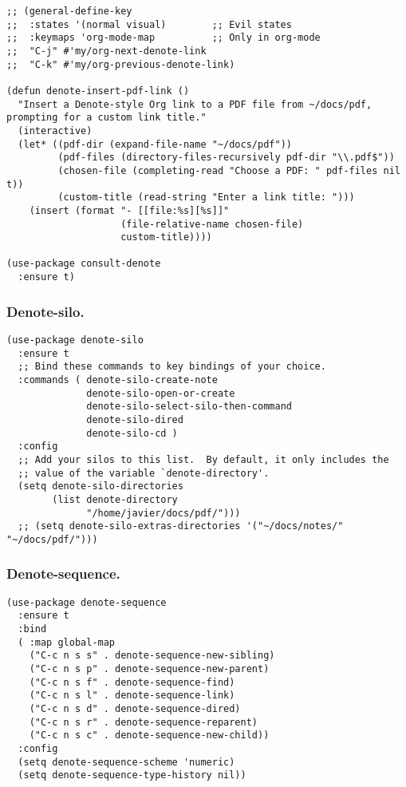 \documentclass[11pt]{article}
\begin{document}
\begin{verbatim}
;; (general-define-key
;;  :states '(normal visual)        ;; Evil states
;;  :keymaps 'org-mode-map          ;; Only in org-mode
;;  "C-j" #'my/org-next-denote-link
;;  "C-k" #'my/org-previous-denote-link)

(defun denote-insert-pdf-link ()
  "Insert a Denote-style Org link to a PDF file from ~/docs/pdf, prompting for a custom link title."
  (interactive)
  (let* ((pdf-dir (expand-file-name "~/docs/pdf"))
         (pdf-files (directory-files-recursively pdf-dir "\\.pdf$"))
         (chosen-file (completing-read "Choose a PDF: " pdf-files nil t))
         (custom-title (read-string "Enter a link title: ")))
    (insert (format "- [[file:%s][%s]]"
                    (file-relative-name chosen-file)
                    custom-title))))

(use-package consult-denote
  :ensure t)
\end{verbatim}
\subsubsection{Denote-silo.}
\label{sec:orgb8fdb50}
\begin{verbatim}
(use-package denote-silo
  :ensure t
  ;; Bind these commands to key bindings of your choice.
  :commands ( denote-silo-create-note
              denote-silo-open-or-create
              denote-silo-select-silo-then-command
              denote-silo-dired
              denote-silo-cd )
  :config
  ;; Add your silos to this list.  By default, it only includes the
  ;; value of the variable `denote-directory'.
  (setq denote-silo-directories
        (list denote-directory
              "/home/javier/docs/pdf/")))
  ;; (setq denote-silo-extras-directories '("~/docs/notes/" "~/docs/pdf/")))
\end{verbatim}
\subsubsection{Denote-sequence.}
\label{sec:orgf006bf7}
\begin{verbatim}
(use-package denote-sequence
  :ensure t
  :bind
  ( :map global-map
    ("C-c n s s" . denote-sequence-new-sibling)
    ("C-c n s p" . denote-sequence-new-parent)
    ("C-c n s f" . denote-sequence-find)
    ("C-c n s l" . denote-sequence-link)
    ("C-c n s d" . denote-sequence-dired)
    ("C-c n s r" . denote-sequence-reparent)
    ("C-c n s c" . denote-sequence-new-child))
  :config
  (setq denote-sequence-scheme 'numeric)
  (setq denote-sequence-type-history nil))
\end{verbatim}
\end{document}
